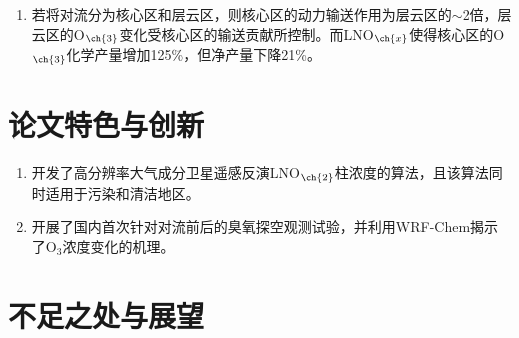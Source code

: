 \begin{enumerate}[label=（\arabic*）, labelindent=\parindent, nosep, leftmargin=0pt, widest=0, itemindent=*, topsep=0pt, partopsep=0pt, parsep=0pt]
\item 若将对流分为核心区和层云区，则核心区的动力输送作用为层云区的$\sim$2倍，层云区的O$_{\ch{3}}$变化受核心区的输送贡献所控制。而LNO$_{\ch{x}}$使得核心区的O$_{\ch{3}}$化学产量增加125\%，但净产量下降21\%。


\end{enumerate}

\section{论文特色与创新}

\begin{enumerate}[label=（\arabic*）, labelindent=\parindent, nosep, leftmargin=0pt, widest=0, itemindent=*, topsep=0pt, partopsep=0pt, parsep=0pt]

\item 开发了高分辨率大气成分卫星遥感反演LNO$_{\ch{2}}$柱浓度的算法，且该算法同时适用于污染和清洁地区。

\item 开展了国内首次针对对流前后的臭氧探空观测试验，并利用WRF-Chem揭示了O$_3$浓度变化的机理。





\end{enumerate}



\section{不足之处与展望}

